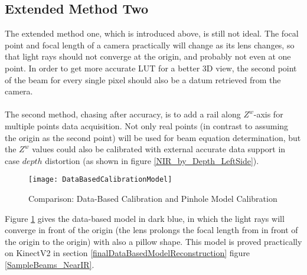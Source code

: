 \subsection{Extended Method Two}
The extended method one, which is introduced above, is still not ideal. The focal point and focal length of a camera practically will change as its lens changes, so that light rays should not converge at the origin, and probably not even at one point. In order to get more accurate LUT for a better 3D view, the second point of the beam for every single pixel should also be a datum retrieved from the camera. %
\\\\%
The second method, chasing after accuracy, is to add a rail along \(Z^w\)-axis for multiple points data acquisition. Not only real points (in contrast to assuming the origin as the second point) will be used for beam equation determination, but the \(Z^w\) values could also be calibrated with external accurate data support in case \(depth\) distortion (as shown in figure \ref{NIR_by_Depth_LeftSide}).
%
\begin{figure}[H]
\centering
\texttt{[image: DataBasedCalibrationModel]}
\caption{Comparison: Data-Based Calibration and Pinhole Model Calibration}
\label{DataBasedCalibrationModel}
\end{figure}%
%
%
\noindent
Figure \ref{DataBasedCalibrationModel} gives the data-based model in dark blue, in which the light rays will converge in front of the origin (the lens prolongs the focal length from in front of the origin to the origin) with also a pillow shape. This model is proved practically on KinectV2 in section \ref{finalDataBasedModelReconstruction} figure \ref{SampleBeams_NearIR}.


























